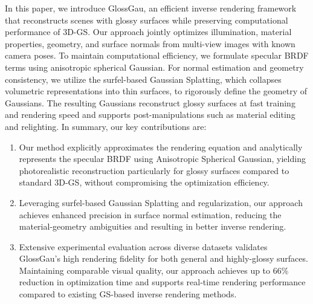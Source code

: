 In this paper, we introduce GlossGau, an efficient inverse rendering framework that reconstructs scenes with glossy surfaces while preserving computational performance of 3D-GS. Our approach jointly optimizes illumination, material properties, geometry, and surface normals from multi-view images with known camera poses. To maintain computational efficiency, we formulate specular BRDF terms using anisotropic spherical Gaussian. For normal estimation and geometry consistency, we utilize the surfel-based Gaussian Splatting, which collapses volumetric representations into thin surfaces, to rigorously define the geometry of Gaussians. The resulting Gaussians reconstruct glossy surfaces at fast training and rendering speed and supports post-manipulations such as material editing and relighting. In summary, our key contributions are:
\begin{enumerate}
    \item Our method explicitly approximates the rendering equation and analytically represents the specular BRDF using Anisotropic Spherical Gaussian, yielding photorealistic reconstruction particularly for glossy surfaces compared to standard 3D-GS, without compromising the optimization efficiency. 
    \item Leveraging surfel-based Gaussian Splatting and regularization, our approach achieves enhanced precision in surface normal estimation, reducing the material-geometry ambiguities and resulting in better inverse rendering. 
    \item Extensive experimental evaluation across diverse datasets validates GlossGau's high rendering fidelity for both general and highly-glossy surfaces. Maintaining comparable visual quality, our approach achieves up to 66\% reduction in optimization time and supports real-time rendering performance compared to existing GS-based inverse rendering methods.
\end{enumerate}



